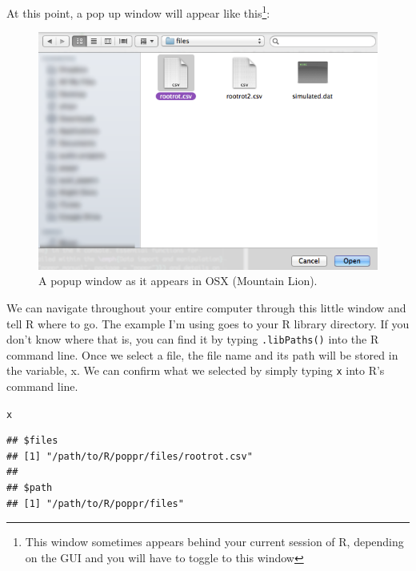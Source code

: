 \documentclass[letterpaper]{article}\usepackage[]{graphicx}\usepackage[]{color}
\makeatletter
\newcommand{\hlstd}[1]{\textcolor[rgb]{0,0,0}{#1}}%
\newenvironment{kframe}{%
 \def\at@end@of@kframe{}%
 \ifinner\ifhmode%
  \def\at@end@of@kframe{\end{minipage}}%
  \begin{minipage}{\columnwidth}%
 \fi\fi%
 \def\FrameCommand##1{\hskip\@totalleftmargin \hskip-\fboxsep
 \colorbox{shadecolor}{##1}\hskip-\fboxsep
     \hskip-\linewidth \hskip-\@totalleftmargin \hskip\columnwidth}%
 \MakeFramed {\advance\hsize-\width
   \@totalleftmargin\z@ \linewidth\hsize
   \@setminipage}}%
 {\par\unskip\endMakeFramed%
 \at@end@of@kframe}
\newenvironment{knitrout}{}{} %
\makeatother
\begin{document}
At this point, a pop up window will appear like this\footnote{This window sometimes appears behind your current session of R, depending on the GUI and you will have to toggle to this window}:
\begin{figure}[h!]
  \centering
  \caption{\footnotesize \footnotesize A popup window as it appears in OSX (Mountain Lion).}
  \label{getfile window}
\includegraphics{getfile.png}
\end{figure}
\begin{center}
\end{center}
\newpage

We can navigate throughout your entire computer through this little window and tell R where to go. The example I'm using goes to your R library directory. If you don't know where that is, you can find it by typing \texttt{.libPaths()} into the R command line.
Once we select a file, the file name and its path will be stored in the variable, x. We can confirm what we selected by simply typing \texttt{x} into R's command line.
\begin{knitrout}\footnotesize
{}\color{fgcolor}\begin{kframe}
\begin{alltt}
\hlstd{x}
\end{alltt}
\begin{verbatim}
## $files
## [1] "/path/to/R/poppr/files/rootrot.csv"
## 
## $path
## [1] "/path/to/R/poppr/files"
\end{verbatim}
\end{kframe}
\end{knitrout}
\end{document}
